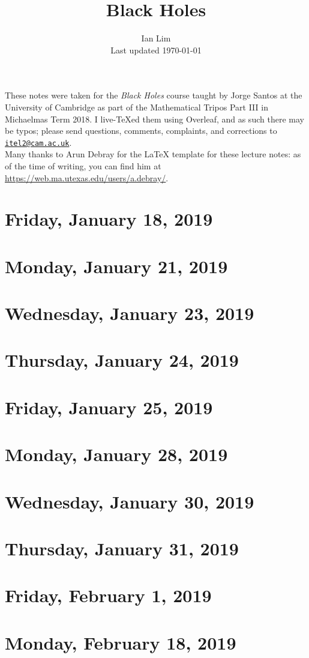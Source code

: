 \documentclass[reqno]{amsart}
\begin{document}
\title{Black Holes}
\author{Ian Lim\\ Last updated \today}
\maketitle
{\small\noindent These notes were taken for the \textit{Black Holes} course taught by Jorge Santos at the University of Cambridge as part of the Mathematical Tripos Part III in Michaelmas Term 2018. I live-\TeX ed them using Overleaf, and as such there may be typos; please send questions, comments, complaints, and corrections to 
\href{mailto:itel2@cam.ac.uk?subject=BH\%20Lecture\%20Notes}{\texttt{itel2@cam.ac.uk}}.\\
Many thanks to Arun Debray for the {\LaTeX} template for these lecture notes: as of the time of writing, you can find him at \url{https://web.ma.utexas.edu/users/a.debray/}.}

\tableofcontents

\section{Friday, January 18, 2019}
	

\section{Monday, January 21, 2019}
    

\section{Wednesday, January 23, 2019}
    

\section{Thursday, January 24, 2019}
    

\section{Friday, January 25, 2019}
    
    
\section{Monday, January 28, 2019}
    
    
\section{Wednesday, January 30, 2019}
    

\section{Thursday, January 31, 2019}
    

\section{Friday, February 1, 2019}
    

\section{Monday, February 18, 2019}
    
\end{document}

